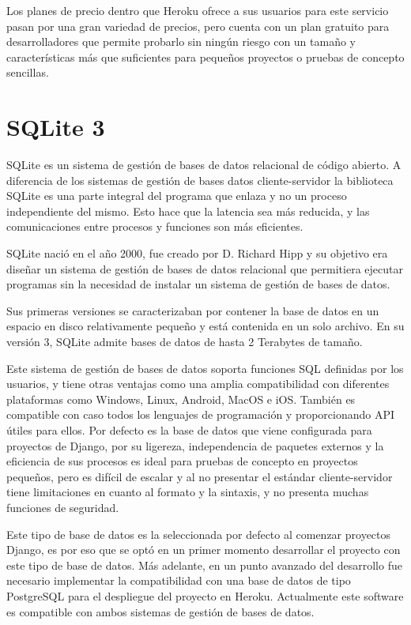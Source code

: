 \documentclass[a4paper, 12pt]{book}
\begin{document}
Los planes de precio dentro que Heroku ofrece a sus usuarios para este servicio pasan por una gran variedad de precios, pero cuenta con un plan gratuito para desarrolladores que permite probarlo sin ningún riesgo con un tamaño y características más que suficientes para pequeños proyectos o pruebas de concepto sencillas. 

\section{SQLite 3}
\label{sec:SQLite}

SQLite es un sistema de gestión de bases de datos relacional de código abierto.  A diferencia de los sistemas de gestión de bases datos cliente-servidor la biblioteca SQLite es una parte integral del programa que enlaza y no un proceso independiente del mismo. Esto hace que la latencia sea más reducida, y las comunicaciones entre procesos y funciones son más eficientes. 

SQLite nació en el año 2000, fue creado por D. Richard Hipp y su objetivo era diseñar un sistema de gestión de bases de datos relacional que permitiera ejecutar programas sin la necesidad de instalar un sistema de gestión de bases de datos. 

Sus primeras versiones se caracterizaban por contener la base de datos en un espacio en disco relativamente pequeño y está contenida en un solo archivo. En su versión 3, SQLite admite bases de datos de hasta 2 Terabytes de tamaño. 

Este sistema de gestión de bases de datos soporta funciones SQL definidas por los usuarios, y tiene otras ventajas como una amplia compatibilidad con diferentes plataformas como Windows, Linux, Android, MacOS e iOS. También es compatible con caso todos los lenguajes de programación y proporcionando API útiles para ellos. Por defecto es la base de datos que viene configurada para proyectos de Django, por su ligereza, independencia de paquetes externos y la eficiencia de sus procesos es ideal para pruebas de concepto en proyectos pequeños, pero es difícil de escalar y al no presentar el estándar cliente-servidor tiene limitaciones en cuanto al formato y la sintaxis, y no presenta muchas funciones de seguridad.

Este tipo de base de datos es la seleccionada por defecto al comenzar proyectos Django, es por eso que se optó en un primer momento desarrollar el proyecto con este tipo de base de datos. Más adelante, en un punto avanzado del desarrollo fue necesario implementar la compatibilidad con una base de datos de tipo PostgreSQL para el despliegue del proyecto en Heroku. Actualmente este software es compatible con ambos sistemas de gestión de bases de datos.
\end{document}
